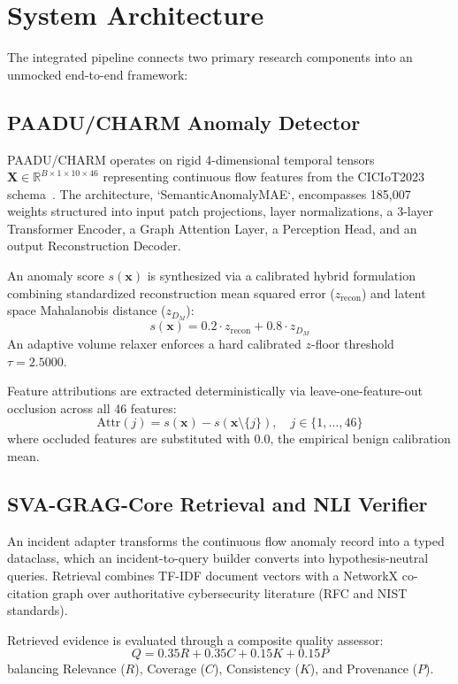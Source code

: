\documentclass[conference]{IEEEtran}
\begin{document}
\section{System Architecture}
The integrated pipeline connects two primary research components into an unmocked end-to-end framework:

\subsection{PAADU/CHARM Anomaly Detector}
\textsc{PAADU/CHARM} operates on rigid 4-dimensional temporal tensors $\mathbf{X} \in \mathbb{R}^{B \times 1 \times 10 \times 46}$ representing continuous flow features from the CICIoT2023 schema~\cite{ciciot2023}. The architecture, `SemanticAnomalyMAE`, encompasses 185,007 weights structured into input patch projections, layer normalizations, a 3-layer Transformer Encoder, a Graph Attention Layer, a Perception Head, and an output Reconstruction Decoder.

An anomaly score $s(\mathbf{x})$ is synthesized via a calibrated hybrid formulation combining standardized reconstruction mean squared error ($z_{\text{recon}}$) and latent space Mahalanobis distance ($z_{D_M}$):
\begin{equation}
s(\mathbf{x}) = 0.2 \cdot z_{\text{recon}} + 0.8 \cdot z_{D_M}
\end{equation}
An adaptive volume relaxer enforces a hard calibrated $z$-floor threshold $\tau = 2.5000$.

Feature attributions are extracted deterministically via leave-one-feature-out occlusion across all 46 features:
\begin{equation}
\text{Attr}(j) = s(\mathbf{x}) - s(\mathbf{x} \setminus \{j\}), \quad j \in \{1, \dots, 46\}
\end{equation}
where occluded features are substituted with $0.0$, the empirical benign calibration mean.

\subsection{SVA-GRAG-Core Retrieval and NLI Verifier}
An incident adapter transforms the continuous flow anomaly record into a typed dataclass, which an incident-to-query builder converts into hypothesis-neutral queries. Retrieval combines TF-IDF document vectors with a NetworkX co-citation graph over authoritative cybersecurity literature (RFC and NIST standards).

Retrieved evidence is evaluated through a composite quality assessor:
\begin{equation}
Q = 0.35 R + 0.35 C + 0.15 K + 0.15 P
\end{equation}
balancing Relevance ($R$), Coverage ($C$), Consistency ($K$), and Provenance ($P$).
\end{document}
